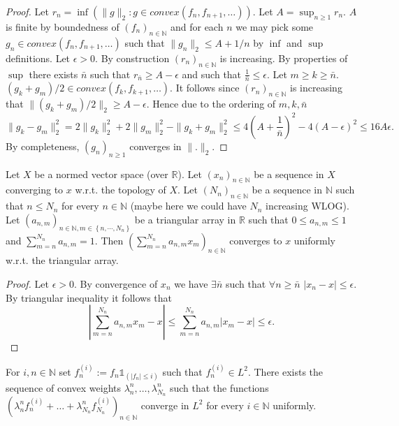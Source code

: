 \begin{proof}
  Let $r_n = \inf(\|g\|_2:g\in convex(f_n, f_{n+1},\ldots))$.
  Let $A=\sup_{n\geq1} r_n$. $A$ is finite by boundedness of $(f_n)_{n\in\mathbb{N}}$ and
  for each $n$ we  may pick some $g_n\in convex(f_n, f_{n+1},\ldots)$ such that $ \|g_n\|_2\leq A+1/n$ by $\inf$ and $\sup$ definitions.
  Let $\epsilon>0$.
  By construction $(r_n)_{n\in\mathbb{N}}$ is increasing. By properties of $\sup$ there exists $\bar{n}$ such that $r_{\bar{n}}\geq A-\epsilon$ and such that $\frac{1}{\bar{n}}\leq\epsilon$.
  Let $m\geq k\geq \bar{n}$. $(g_k+g_m)/2 \in convex(f_k,f_{k+1},\ldots)$. It follows since $(r_n)_{n\in\mathbb{N}}$ is increasing that
  $\|(g_k+g_m)/2\|_2\geq A-\epsilon$.
  Hence due to the ordering of $m,k,\bar{n}$
  $$ \|g_k-g_m\|_2^2=2 \|g_k\|_2^2+2\|g_m\|_2^2- \|g_k+g_m\|_2^2
  \leq 4(A+\frac{1}{\bar{n}})^2-4(A-\epsilon)^2\leq 16A\epsilon.$$ By completeness, $(g_n)_{n\geq1}$  converges in $\|.\|_2$.
\end{proof}


\begin{lemma}\label{lem:convex_of_converg_seq_is_converg}
  Let $X$ be a normed vector space (over $\mathbb{R}$).
  Let $(x_n)_{n\in\mathbb{N}}$ be a sequence in $X$ converging to $x$ w.r.t. the topology of $X$.
  Let $(N_n)_{n\in\mathbb{N}}$ be a sequence in $\mathbb{N}$ such that $n\leq N_n$ for every $n\in\mathbb{N}$ (maybe here we could have $N_n$ increasing WLOG).
  Let $(a_{n,m})_{n\in\mathbb{N},m\in\left\lbrace n,\cdots,N_n\right\rbrace}$ be a triangular array in $\mathbb{R}$ such that $0\leq a_{n,m}\leq 1$ and $\sum_{m=n}^{N_n}a_{n,m}=1$.
  Then $(\sum_{m=n}^{N_n}a_{n,m}x_m)_{n\in\mathbb{N}}$ converges to $x$ uniformly w.r.t. the triangular array.
\end{lemma}

\begin{proof}
  Let $\epsilon>0$.
  By convergence of $x_n$ we have $\exists \bar{n}$ such that $\forall n\geq\bar{n}$ $|x_n-x|\leq \epsilon$.
  By triangular inequality it follows that
  $$
  |\sum_{m=n}^{N_n}a_{n,m}x_m - x|\leq \sum_{m=n}^{N_n}a_{n,m}|x_m-x|\leq\epsilon.
  $$
\end{proof}


\begin{lemma}\label{lem:komlos_convex_aux}
  For $i,n\in\mathbb{N}$ set $f_{n}^{(i)}:=f_n \mathbb{1}_{(|f_n|\leq i)}$ such that $f_{n}^{(i)}\in L^2$.
  There exists the sequence of convex weights $\lambda_n^{n}, \ldots, \lambda_{N_n}^{n}$ such that the functions
  $ (\lambda_n^{n} f_n^{(i)} + \ldots+\lambda_{N_n}^{n} f_{N_n}^{(i)})_{n\in\mathbb{N}}$
  converge in $L^2$ for every $i\in\mathbb{N}$ uniformly.
\end{lemma}

